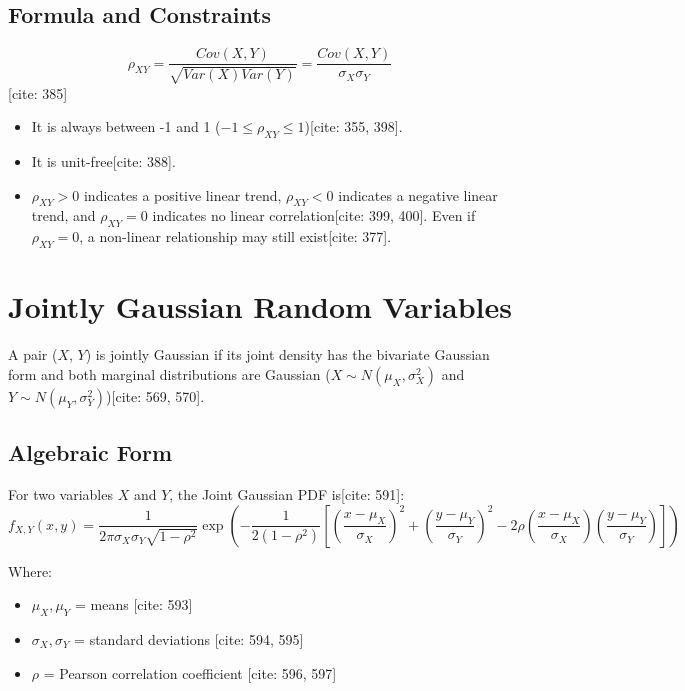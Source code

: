 \documentclass[11pt]{article}
\begin{document}
\subsection{Formula and Constraints}
$$\rho_{XY}=\frac{Cov(X,Y)}{\sqrt{Var(X)Var(Y)}}=\frac{Cov(X,Y)}{\sigma_{X}\sigma_{Y}}$$ [cite: 385]
\begin{itemize}
    \item It is always between -1 and 1 ($-1\le\rho_{XY}\le1$)[cite: 355, 398].
    \item It is unit-free[cite: 388].
    \item $\rho_{XY}>0$ indicates a positive linear trend, $\rho_{XY}<0$ indicates a negative linear trend, and $\rho_{XY}=0$ indicates no linear correlation[cite: 399, 400]. Even if $\rho_{XY}=0$, a non-linear relationship may still exist[cite: 377].
\end{itemize}

\section{Jointly Gaussian Random Variables}
A pair ($X$, $Y$) is jointly Gaussian if its joint density has the bivariate Gaussian form and both marginal distributions are Gaussian ($X\sim N(\mu_{X},\sigma_{X}^{2})$ and $Y\sim N(\mu_{Y},\sigma_{Y}^{2})$)[cite: 569, 570].

\subsection{Algebraic Form}
For two variables $X$ and $Y$, the Joint Gaussian PDF is[cite: 591]:
$$f_{X,Y}(x,y)=\frac{1}{2\pi\sigma_{X}\sigma_{Y}\sqrt{1-\rho^{2}}}\exp\left(-\frac{1}{2(1-\rho^{2})}\left[\left(\frac{x-\mu_{X}}{\sigma_{X}}\right)^{2}+\left(\frac{y-\mu_{Y}}{\sigma_{Y}}\right)^{2}-2\rho\left(\frac{x-\mu_{X}}{\sigma_{X}}\right)\left(\frac{y-\mu_{Y}}{\sigma_{Y}}\right)\right]\right)$$

Where:
\begin{itemize}
    \item $\mu_{X}, \mu_{Y}$ = means [cite: 593]
    \item $\sigma_{X}, \sigma_{Y}$ = standard deviations [cite: 594, 595]
    \item $\rho$ = Pearson correlation coefficient [cite: 596, 597]
\end{itemize}
\end{document}
